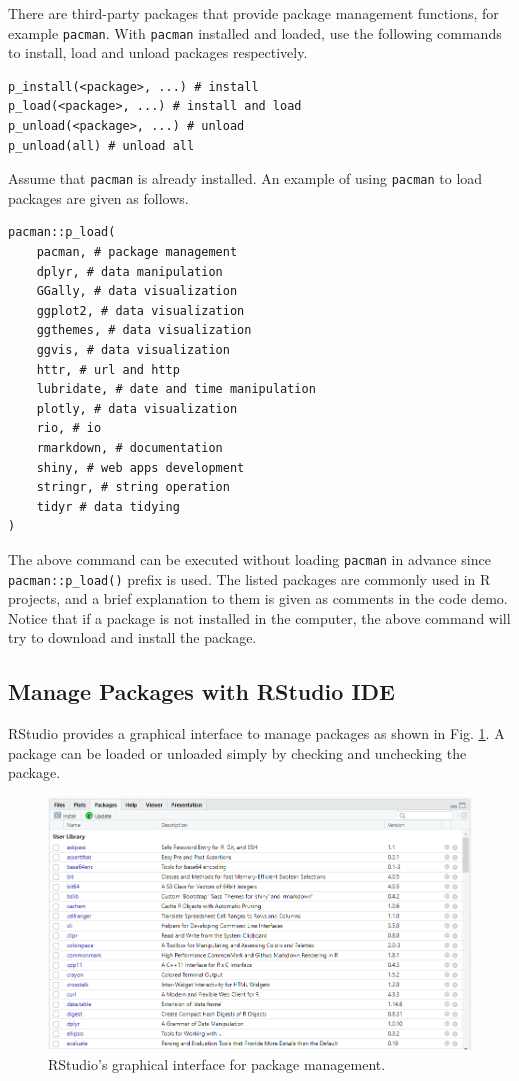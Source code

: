 There are third-party packages that provide package management functions, for example \verb|pacman|. With \verb|pacman| installed and loaded, use the following commands to install, load and unload packages respectively.
\begin{lstlisting}
p_install(<package>, ...) # install
p_load(<package>, ...) # install and load
p_unload(<package>, ...) # unload
p_unload(all) # unload all
\end{lstlisting}
Assume that \verb|pacman| is already installed. An example of using \verb|pacman| to load packages are given as follows.
\begin{lstlisting}
pacman::p_load(
	pacman, # package management
	dplyr, # data manipulation
	GGally, # data visualization
	ggplot2, # data visualization
	ggthemes, # data visualization
	ggvis, # data visualization
	httr, # url and http
	lubridate, # date and time manipulation
	plotly, # data visualization
	rio, # io
	rmarkdown, # documentation
	shiny, # web apps development
	stringr, # string operation
	tidyr # data tidying
)
\end{lstlisting}
The above command can be executed without loading \verb|pacman| in advance since \verb|pacman::p_load()| prefix is used. The listed packages are commonly used in R projects, and a brief explanation to them is given as comments in the code demo. Notice that if a package is not installed in the computer, the above command will try to download and install the package.

\subsection{Manage Packages with RStudio IDE}

RStudio provides a graphical interface to manage packages as shown in Fig. \ref{ch:r1:fig:rstudio_package_management}. A package can be loaded or unloaded simply by checking and unchecking the package.
\begin{figure}
\centering
\includegraphics[width=350pt]{chapters/ch-r/figures/rstudio_package_management.png}
\caption{RStudio's graphical interface for package management.} \label{ch:r1:fig:rstudio_package_management}
\end{figure}

